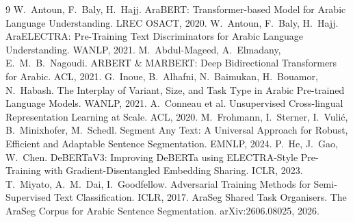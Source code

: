 \begin{thebibliography}{9}\small
{} W.~Antoun, F.~Baly, H.~Hajj. AraBERT: Transformer-based
Model for Arabic Language Understanding. LREC OSACT, 2020.
 W.~Antoun, F.~Baly, H.~Hajj. AraELECTRA: Pre-Training
Text Discriminators for Arabic Language Understanding. WANLP, 2021.
 M.~Abdul-Mageed, A.~Elmadany, E.~M.~B.~Nagoudi.
ARBERT \& MARBERT: Deep Bidirectional Transformers for Arabic. ACL, 2021.
 G.~Inoue, B.~Alhafni, N.~Baimukan, H.~Bouamor,
N.~Habash. The Interplay of Variant, Size, and Task Type in Arabic Pre-trained
Language Models. WANLP, 2021.
 A.~Conneau et al. Unsupervised Cross-lingual
Representation Learning at Scale. ACL, 2020.
 M.~Frohmann, I.~Sterner, I.~Vuli\'c, B.~Minixhofer,
M.~Schedl. Segment Any Text: A Universal Approach for Robust, Efficient and
Adaptable Sentence Segmentation. EMNLP, 2024.
 P.~He, J.~Gao, W.~Chen. DeBERTaV3: Improving DeBERTa
using ELECTRA-Style Pre-Training with Gradient-Disentangled Embedding Sharing.
ICLR, 2023.
 T.~Miyato, A.~M.~Dai, I.~Goodfellow. Adversarial
Training Methods for Semi-Supervised Text Classification. ICLR, 2017.
 AraSeg Shared Task Organisers. The AraSeg Corpus for Arabic
Sentence Segmentation. arXiv:2606.08025, 2026.
\end{thebibliography}


